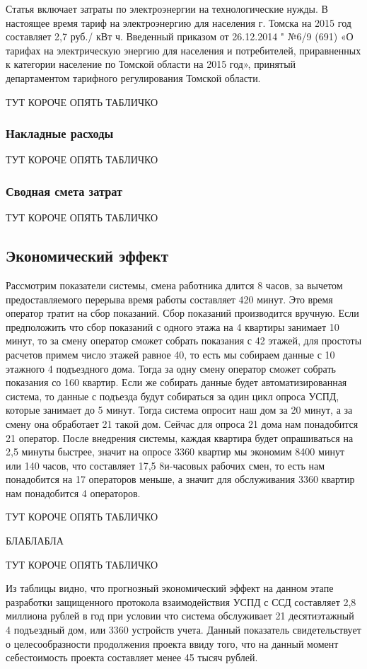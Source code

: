 Статья включает затраты по электроэнергии на технологические нужды. В настоящее время тариф на электроэнергию для населения г. Томска на 2015 год составляет 2,7 руб./ кВт ч. Введенный приказом от 26.12.2014 " №6/9 (691) «О тарифах на электрическую энергию для населения и потребителей, приравненных к категории население по Томской области на 2015 год», принятый департаментом тарифного регулирования Томской области.

ТУТ КОРОЧЕ ОПЯТЬ ТАБЛИЧКО %

\subsubsection{Накладные расходы}

ТУТ КОРОЧЕ ОПЯТЬ ТАБЛИЧКО %

\subsubsection{Сводная смета затрат}

ТУТ КОРОЧЕ ОПЯТЬ ТАБЛИЧКО %

\subsection{Экономический эффект}

Рассмотрим показатели системы, смена работника длится 8 часов, за вычетом предоставляемого перерыва время работы составляет 420 минут. Это время оператор тратит на сбор показаний. Сбор показаний производится вручную. Если предположить что сбор показаний с одного этажа на 4 квартиры занимает 10 минут, то за смену оператор сможет собрать показания с 42 этажей, для простоты расчетов примем число этажей равное 40, то есть мы собираем данные с 10 этажного 4 подъездного дома. Тогда за одну смену оператор сможет собрать показания со 160 квартир. Если же собирать данные будет автоматизированная система, то данные с подъезда будут собираться за один цикл опроса УСПД, которые занимает до 5 минут. Тогда система опросит наш дом за 20 минут, а за смену она обработает 21 такой дом. Сейчас для опроса 21 дома нам понадобится 21 оператор. После внедрения системы, каждая квартира будет опрашиваться на 2,5 минуты быстрее, значит на опросе 3360 квартир мы экономим 8400 минут или 140 часов, что составляет 17,5 8и-часовых рабочих смен, то есть нам понадобится на 17 операторов меньше, а значит для обслуживания 3360 квартир нам понадобится 4 операторов.

ТУТ КОРОЧЕ ОПЯТЬ ТАБЛИЧКО %

БЛАБЛАБЛА

ТУТ КОРОЧЕ ОПЯТЬ ТАБЛИЧКО %

Из таблицы видно, что прогнозный экономический эффект на данном этапе разработки защищенного протокола взаимодействия УСПД с ССД составляет 2,8 миллиона рублей в год при условии что система обслуживает 21 десятиэтажный 4 подъездный дом, или 3360 устройств учета. Данный показатель свидетельствует о целесообразности продолжения проекта ввиду того, что на данный момент себестоимость проекта составляет менее 45 тысяч рублей.